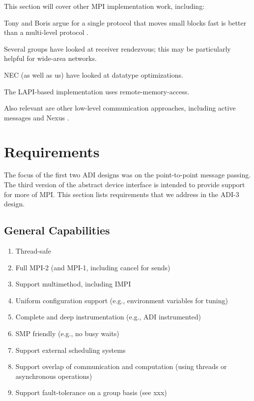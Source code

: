 \documentclass{article}
\begin{document}
This section will cover other MPI implementation work, including:

Tony and Boris argue for a single protocol that moves small blocks fast is
better than a multi-level protocol \cite{techreport}.

Several groups have looked at receiver rendezvous; this may be particularly
helpful for wide-area networks.

NEC (as well as us) have looked at datatype optimizations.

The LAPI-based implementation uses remote-memory-access.

Also relevant are other low-level communication approaches, including active
messages \cite{isca92*256} and Nexus \cite{JPDCNexus,Nexus}.

\section{Requirements}
The focus of the first two ADI designs was on the point-to-point message
passing.  
The third version of the abstract device interface is intended to provide
support for more of MPI.  
This section lists requirements that we address in the ADI-3 design.

\subsection{General Capabilities}
\begin{enumerate}
\item Thread-safe
\item Full MPI-2 (and MPI-1, including cancel for sends)
\item Support multimethod, including IMPI
\item Uniform configuration support (e.g., environment variables for tuning)
\item Complete and deep instrumentation (e.g., ADI instrumented)
\item SMP friendly (e.g., no busy waits)
\item Support external scheduling systems
\item Support overlap of communication and computation (using threads or
  asynchronous operations)
\item Support fault-tolerance on a group basis (see xxx)
\end{enumerate}
\end{document}
